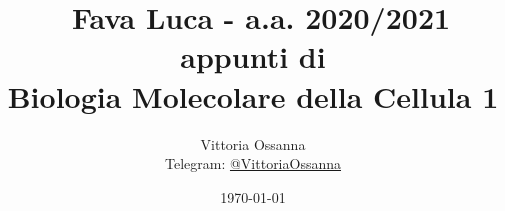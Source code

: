 \documentclass{article}
\title{\
\large Fava Luca - a.a. 2020/2021 \\
\vspace{1cm}
\large appunti di \\
\Huge\textbf{Biologia Molecolare della Cellula 1}
}
\author{
Vittoria Ossanna \\
\small Telegram: \small\href{https://t.me/VittoriaOssanna}{@VittoriaOssanna}
\vspace{11cm}
}
\date{
\small \today
}
\begin{document}
\maketitle
\pagebreak

\pagebreak










\end{document}

